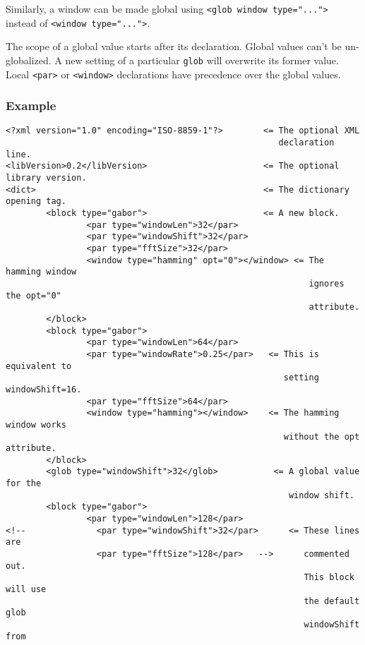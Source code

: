 \documentclass[11pt,a4paper]{article}
\begin{document}
Similarly, a window can be made global using \verb+<glob window type="...">+
instead of \linebreak \verb+<window type="...">+.

The scope of a global value starts after its declaration. Global values can't
be un-globalized. A new setting of a particular \verb+glob+ will overwrite its
former value. Local \verb+<par>+ or \verb+<window>+ declarations have
precedence over the global values.


\subsubsection*{Example}

\begin{verbatim}
<?xml version="1.0" encoding="ISO-8859-1"?>        <= The optional XML
                                                      declaration line.
<libVersion>0.2</libVersion>                       <= The optional library version.
<dict>                                             <= The dictionary opening tag.
        <block type="gabor">                       <= A new block.
                <par type="windowLen">32</par>
                <par type="windowShift">32</par>
                <par type="fftSize">32</par>
                <window type="hamming" opt="0"></window> <= The hamming window
                                                            ignores the opt="0"
                                                            attribute.
        </block>
        <block type="gabor">
                <par type="windowLen">64</par>
                <par type="windowRate">0.25</par>   <= This is equivalent to
                                                       setting windowShift=16.
                <par type="fftSize">64</par>
                <window type="hamming"></window>    <= The hamming window works
                                                       without the opt attribute.
        </block>
        <glob type="windowShift">32</glob>           <= A global value for the
                                                        window shift.
        <block type="gabor">
                <par type="windowLen">128</par>
<!--              <par type="windowShift">32</par>      <= These lines are
                  <par type="fftSize">128</par>   -->      commented out.
                                                           This block will use
                                                           the default glob
                                                           windowShift from

\end{verbatim}
\end{document}

